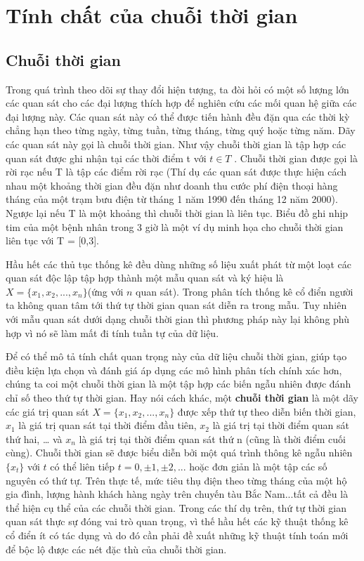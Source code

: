 \chapter{Tính chất của chuỗi thời gian}
\ifpdf
    \graphicspath{{1_timeseries/figures/PNG/}{1_timeseries/figures/PDF/}{1_timeseries/figures/}}
\else
    \graphicspath{{1_timeseries/figures/EPS/}{1_timeseries/figures/}}
\fi

\section{Chuỗi thời gian}
Trong quá trình theo dõi sự thay đổi hiện tượng, ta đòi hỏi có một số lượng lớn các quan sát cho các đại lượng thích hợp để nghiên cứu các mối quan hệ giữa các đại lượng này. Các quan sát này có thể được tiến hành đều đặn qua các thời kỳ chẳng hạn theo từng ngày, từng tuần, từng tháng, từng quý hoặc từng năm. Dãy các quan sát này gọi là chuỗi thời gian. Như vậy chuỗi thời gian là tập hợp các quan sát được ghi nhận tại các thời điểm t với $t \in T$ . Chuỗi thời gian được gọi là rời rạc nếu T là tập các điểm rời rạc (Thí dụ các quan sát được thực hiện cách nhau một khoảng thời gian đều đặn như doanh thu cước phí điện thoại hàng tháng của một trạm bưu điện từ tháng 1 năm 1990 đến tháng 12 năm 2000). Ngược lại nếu T là một khoảng thì chuỗi thời gian là liên tục. Biểu đồ ghi nhịp tim của một bệnh nhân trong 3 giờ là một ví dụ minh họa cho chuỗi thời gian liên tục với T =  [0,3].

Hầu hết các thủ tục thống kê đều dùng những số liệu xuất phát từ một loạt các quan sát độc lập tập hợp thành một mẫu quan sát và ký hiệu là $X =\{x_1,x_2,...,x_n\}$(ứng với $n$ quan sát). Trong phân tích thống kê cổ điển người ta không quan tâm tới thứ tự thời gian quan sát diễn ra trong mẫu. Tuy nhiên với mẫu quan sát dưới dạng chuỗi thời gian thì phương pháp này lại không phù hợp vì nó sẽ làm mất đi tính tuần tự của dữ liệu.

Để có thể mô tả tính chất quan trọng này của dữ liệu chuỗi thời gian, giúp tạo điều kiện lựa chọn và đánh giá áp dụng các mô hình phân tích chính xác hơn, chúng ta coi một chuỗi thời gian là một tập hợp các biến ngẫu nhiên được đánh chỉ số theo thứ tự thời gian. Hay nói cách khác, một \textbf{chuỗi thời gian}\citep{ross} là một dãy các giá trị quan sát $X =\{x_1,x_2,...,x_n\}$ được xếp thứ tự theo diễn biến thời gian, $x_1$ là giá trị quan sát tại thời điểm đầu tiên, $x_2$ là giá trị tại thời điểm quan sát thứ hai, … và $x_n$  là giá trị tại thời điểm quan sát thứ n (cũng là thời điểm cuối cùng). Chuỗi thời gian sẽ được biểu diễn bởi một quá trình thông kê ngẫu nhiên $\{x_t\}$ với $t$ có thể liên tiếp $t = 0, \pm1,\pm2,...$ hoặc đơn giản là một tập các số nguyên có thứ tự. Trên thực tế, mức tiêu thụ điện theo từng tháng của một hộ gia đình, lượng hành khách hàng ngày trên chuyến tàu Bắc Nam...tất cả đều là thể hiện cụ thể của các chuỗi thời gian. Trong các thí dụ trên, thứ tự thời gian quan sát thực sự đóng vai trò quan trọng, vì thế hầu hết các kỹ thuật thống kê cổ điển ít có tác dụng và do đó cần phải đề xuất những kỹ thuật tính toán mới để bộc lộ được các nét đặc thù của chuỗi thời gian. 

